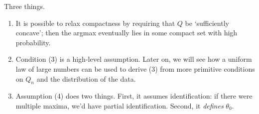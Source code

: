 \documentclass[11pt,letterpaper,reqno,oneside]{article}
\begin{document}
\begin{remark}
	Three things.
	\begin{enumerate}

		\item It is possible to relax compactness by requiring that $Q$ be `sufficiently concave'; then the argmax eventually lies in some compact set with high probability.

		\item Condition (3) is a high-level assumption. Later on, we will see how a uniform law of large numbers can be used to derive (3) from more primitive conditions on $Q_n$ and the distribution of the data.

		\item Assumption (4) does two things. First, it assumes identification: if there were multiple maxima, we'd have partial identification. Second, it \emph{defines} $\theta_0$.

	\end{enumerate}
\end{remark}
\end{document}

